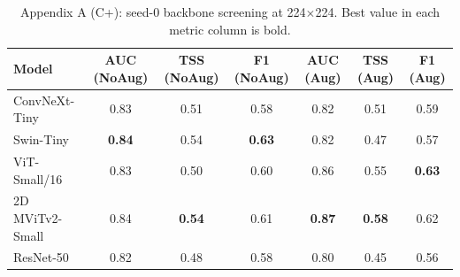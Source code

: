 \begin{table}[p]
\centering
\scriptsize
\caption{Appendix A (C+): seed-0 backbone screening at 224$\times$224. Best value in each metric column is bold.}
\label{tab:appA_seed0_cplus}
\begin{tabular}{lcccccc}
\toprule
Model & AUC (NoAug) & TSS (NoAug) & F1 (NoAug) & AUC (Aug) & TSS (Aug) & F1 (Aug) \\
\midrule
ConvNeXt-Tiny & 0.83 & 0.51 & 0.58 & 0.82 & 0.51 & 0.59 \\
Swin-Tiny & \textbf{0.84} & 0.54 & \textbf{0.63} & 0.82 & 0.47 & 0.57 \\
ViT-Small/16 & 0.83 & 0.50 & 0.60 & 0.86 & 0.55 & \textbf{0.63} \\
2D MViTv2-Small & 0.84 & \textbf{0.54} & 0.61 & \textbf{0.87} & \textbf{0.58} & 0.62 \\
ResNet-50 & 0.82 & 0.48 & 0.58 & 0.80 & 0.45 & 0.56 \\
\bottomrule
\end{tabular}
\end{table}
